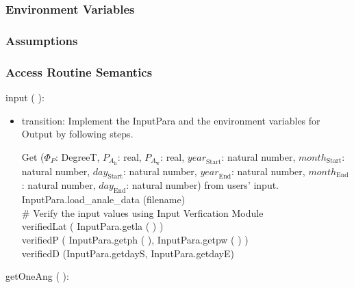 \documentclass[12pt, titlepage]{article}
\begin{document}
\subsubsection{Environment Variables}


\subsubsection{Assumptions}


\subsubsection{ Access Routine Semantics}

\noindent  input ( ):

\begin{itemize}
\item transition: Implement the InputPara and  the environment variables for Output by following steps.

Get ($\Phi_P$: DegreeT, $P_{A_{\text{h}}}$: real, $P_{A_{\text{w}}}$: real, $\mathit{year}_\text{Start}$: natural number, $\mathit{month}_\text{Start}$: natural number, $\mathit{day}_\text{Start}$: natural number, $\mathit{year}_\text{End}$: natural number, $\mathit{month}_\text{End}$: natural number, $\mathit{day}_\text{End}$: natural number) from users' input.\\


InputPara.load\_anale\_data (filename)\\


$\#$ Verify the input values using Input Verfication Module\\
verifiedLat ( InputPara.getla ( ) )\\
verifiedP ( InputPara.getph ( ), InputPara.getpw ( ) )\\
verifiedD (InputPara.getdayS, InputPara.getdayE)\\


\end{itemize}

\noindent  getOneAng ( ):
\end{document}
